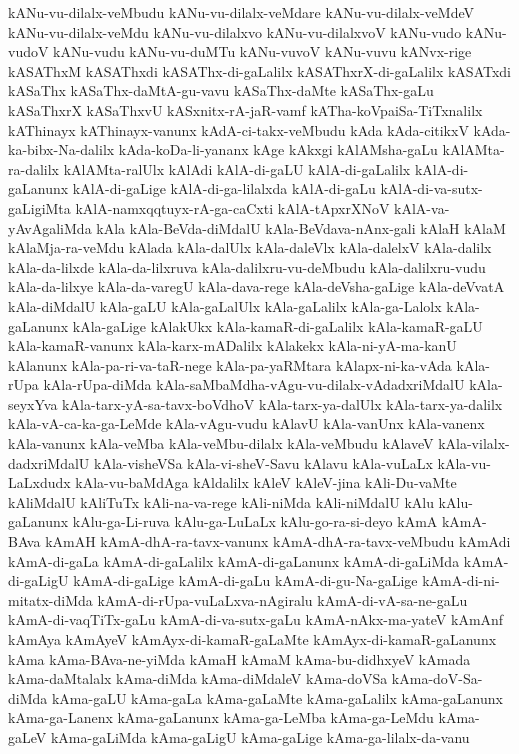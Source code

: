 {kANu-vu-dilalx-veMbudu
kANu-vu-dilalx-veMdare
kANu-vu-dilalx-veMdeV
kANu-vu-dilalx-veMdu
kANu-vu-dilalxvo
kANu-vu-dilalxvoV
kANu-vudo
kANu-vudoV
kANu-vudu
kANu-vu-duMTu
kANu-vuvoV
kANu-vuvu
kANvx-rige
kASAThxM
kASAThxdi
kASAThx-di-gaLalilx
kASAThxrX-di-gaLalilx
kASATxdi
kASaThx
kASaThx-daMtA-gu-vavu
kASaThx-daMte
kASaThx-gaLu
kASaThxrX
kASaThxvU
kASxnitx-rA-jaR-vamf
kATha-koVpaiSa-TiTxnalilx
kAThinayx
kAThinayx-vanunx
kAdA-ci-takx-veMbudu
kAda
kAda-citikxV
kAda-ka-bibx-Na-dalilx
kAda-koDa-li-yananx
kAge
kAkxgi
kAlAMsha-gaLu
kAlAMta-ra-dalilx
kAlAMta-ralUlx
kAlAdi
kAlA-di-gaLU
kAlA-di-gaLalilx
kAlA-di-gaLanunx
kAlA-di-gaLige
kAlA-di-ga-lilalxda
kAlA-di-gaLu
kAlA-di-va-sutx-gaLigiMta
kAlA-namxqqtuyx-rA-ga-caCxti
kAlA-tApxrXNoV
kAlA-va-yAvAgaliMda
kAla
kAla-BeVda-diMdalU
kAla-BeVdava-nAnx-gali
kAlaH
kAlaM
kAlaMja-ra-veMdu
kAlada
kAla-dalUlx
kAla-daleVlx
kAla-dalelxV
kAla-dalilx
kAla-da-lilxde
kAla-da-lilxruva
kAla-dalilxru-vu-deMbudu
kAla-dalilxru-vudu
kAla-da-lilxye
kAla-da-varegU
kAla-dava-rege
kAla-deVsha-gaLige
kAla-deVvatA
kAla-diMdalU
kAla-gaLU
kAla-gaLalUlx
kAla-gaLalilx
kAla-ga-Lalolx
kAla-gaLanunx
kAla-gaLige
kAlakUkx
kAla-kamaR-di-gaLalilx
kAla-kamaR-gaLU
kAla-kamaR-vanunx
kAla-karx-mADalilx
kAlakekx
kAla-ni-yA-ma-kanU
kAlanunx
kAla-pa-ri-va-taR-nege
kAla-pa-yaRMtara
kAlapx-ni-ka-vAda
kAla-rUpa
kAla-rUpa-diMda
kAla-saMbaMdha-vAgu-vu-dilalx-vAdadxriMdalU
kAla-seyxYva
kAla-tarx-yA-sa-tavx-boVdhoV
kAla-tarx-ya-dalUlx
kAla-tarx-ya-dalilx
kAla-vA-ca-ka-ga-LeMde
kAla-vAgu-vudu
kAlavU
kAla-vanUnx
kAla-vanenx
kAla-vanunx
kAla-veMba
kAla-veMbu-dilalx
kAla-veMbudu
kAlaveV
kAla-vilalx-dadxriMdalU
kAla-visheVSa
kAla-vi-sheV-Savu
kAlavu
kAla-vuLaLx
kAla-vu-LaLxdudx
kAla-vu-baMdAga
kAldalilx
kAleV
kAleV-jina
kAli-Du-vaMte
kAliMdalU
kAliTuTx
kAli-na-va-rege
kAli-niMda
kAli-niMdalU
kAlu
kAlu-gaLanunx
kAlu-ga-Li-ruva
kAlu-ga-LuLaLx
kAlu-go-ra-si-deyo
kAmA
kAmA-BAva
kAmAH
kAmA-dhA-ra-tavx-vanunx
kAmA-dhA-ra-tavx-veMbudu
kAmAdi
kAmA-di-gaLa
kAmA-di-gaLalilx
kAmA-di-gaLanunx
kAmA-di-gaLiMda
kAmA-di-gaLigU
kAmA-di-gaLige
kAmA-di-gaLu
kAmA-di-gu-Na-gaLige
kAmA-di-ni-mitatx-diMda
kAmA-di-rUpa-vuLaLxva-nAgiralu
kAmA-di-vA-sa-ne-gaLu
kAmA-di-vaqTiTx-gaLu
kAmA-di-va-sutx-gaLu
kAmA-nAkx-ma-yateV
kAmAnf
kAmAya
kAmAyeV
kAmAyx-di-kamaR-gaLaMte
kAmAyx-di-kamaR-gaLanunx
kAma
kAma-BAva-ne-yiMda
kAmaH
kAmaM
kAma-bu-didhxyeV
kAmada
kAma-daMtalalx
kAma-diMda
kAma-diMdaleV
kAma-doVSa
kAma-doV-Sa-diMda
kAma-gaLU
kAma-gaLa
kAma-gaLaMte
kAma-gaLalilx
kAma-gaLanunx
kAma-ga-Lanenx
kAma-gaLanunx
kAma-ga-LeMba
kAma-ga-LeMdu
kAma-gaLeV
kAma-gaLiMda
kAma-gaLigU
kAma-gaLige
kAma-ga-lilalx-da-vanu
}
